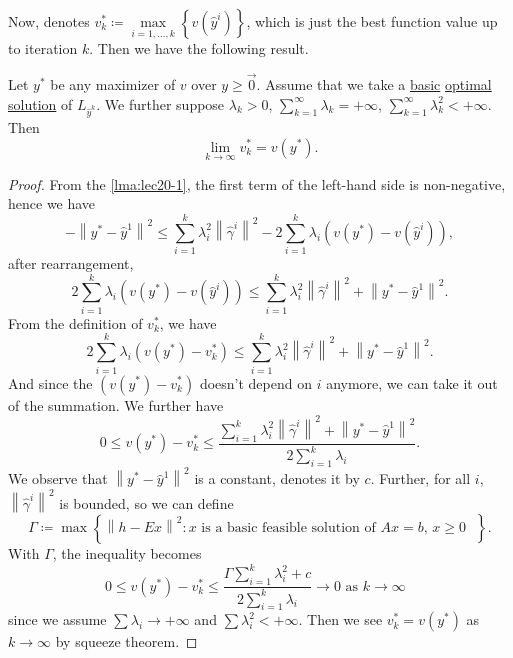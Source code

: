 Now, denotes \(v^{\ast}_{k}\coloneqq \max\limits_{i = 1, \ldots , k}\left\{v(\hat{y}^i)\right\}\), which is just the best function value up to iteration \(k\). Then we have the following result.

\begin{theorem}\label{thm:lec20-1}
	Let \(y^{\ast}\) be any maximizer of \(v\) over \(y\geq \vec{0}\). Assume that we take a \hyperref[def:basic-solution]{basic} \hyperref[def:optimal-solution]{optimal solution}
	of \(L_{\hat{y}^k}\). We further suppose \(\lambda_{k}>0\), \(\sum\limits_{k=1}^{\infty} \lambda_{k} = +\infty \), \(\sum\limits_{k=1}^{\infty} \lambda_{k}^2< +\infty\). Then
	\[
		\lim_{k \to \infty} v^{\ast}_k = v(y^{\ast}).
	\]
\end{theorem}
\begin{proof}
	From the \autoref{lma:lec20-1}, the first term of the left-hand side is non-negative, hence we have
	\[
		- \left\lVert y^{\ast} - \hat{y}^1\right\rVert^2 \leq \sum\limits_{i=1}^{k} \lambda_{i}^{2}\left\lVert \hat{\gamma}^i\right\rVert^2 - 2 \sum\limits_{i=1}^{k} \lambda_{i}\left(v(y^{\ast}) - v(\hat{y}^i)\right),
	\]
	after rearrangement,
	\[
		2 \sum\limits_{i=1}^{k} \lambda_{i}\left(v(y^{\ast}) - v(\hat{y}^i)\right)\leq \sum\limits_{i=1}^{k} \lambda_{i}^{2}\left\lVert \hat{\gamma}^i\right\rVert^2 + \left\lVert y^{\ast} - \hat{y}^1\right\rVert^2.
	\]
	From the definition of \(v^{\ast}_{k}\), we have
	\[
		2 \sum\limits_{i=1}^{k} \lambda_{i}\left(v(y^{\ast}) - v^{\ast}_{k}\right)\leq \sum\limits_{i=1}^{k} \lambda_{i}^{2}\left\lVert \hat{\gamma}^i\right\rVert^2 + \left\lVert y^{\ast} - \hat{y}^1\right\rVert^2.
	\]
	And since the \(\left(v(y^{\ast}) - v^{\ast}_{k}\right)\) doesn't depend on \(i\) anymore, we can take it out of the summation. We further have
	\[
		0\leq v(y^{\ast}) - v^{\ast}_{k}\leq \frac{\sum\limits_{i=1}^{k} \lambda_{i}^{2}\left\lVert \hat{\gamma}^i\right\rVert^2 + \left\lVert y^{\ast} - \hat{y}^1\right\rVert^2}{2 \sum\limits_{i=1}^{k} \lambda_{i}}.
	\]
	We observe that \(\left\lVert y^{\ast} - \hat{y}^1\right\rVert^2 \) is a constant, denotes it by \(c\). Further, for all \(i\), \(\left\lVert \hat{\gamma}^i\right\rVert^2 \) is bounded, so we can define
	\[
		\Gamma\coloneqq \max\left\{\left\lVert h - Ex\right\rVert^2\colon \text{\(x\) is a basic feasible solution of \(Ax = b\), \(x\geq 0\)  }\right\}.
	\]
	With \(\Gamma\), the inequality becomes
	\[
		0\leq v(y^{\ast}) - v^{\ast}_{k}\leq \frac{\Gamma\sum\limits_{i=1}^{k} \lambda_{i}^{2} + c}{2 \sum\limits_{i=1}^{k} \lambda_{i}}\to 0 \text{ as \(k \to  \infty \) }
	\]
	since we assume \(\sum \lambda_{i} \to  +\infty \) and \(\sum\limits\lambda_{i}^{2}< +\infty  \). Then we see \(v^{\ast}_{k} = v(y^{\ast})\) as \(k \to \infty \) by squeeze theorem.
\end{proof}

